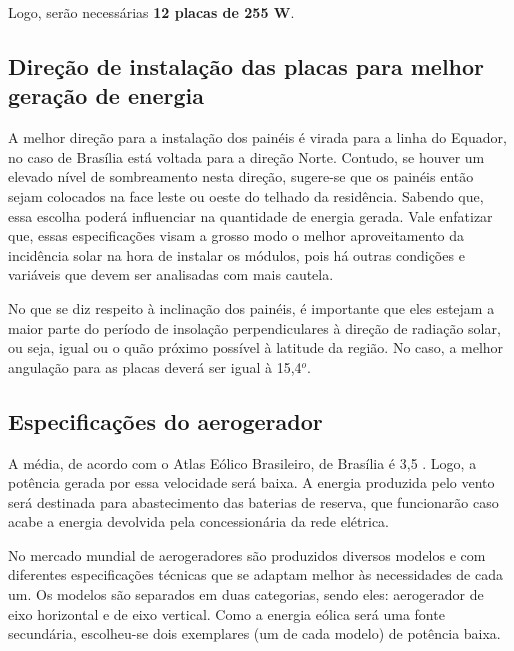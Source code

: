 	Logo, serão necessárias \textbf{12 placas de 255 \si{\watt}}.


\subsection{Direção de instalação das placas para melhor geração de energia}

	A melhor direção para a instalação dos painéis é virada para a linha do Equador, no caso de Brasília está voltada para a direção Norte. Contudo, se houver um elevado nível de sombreamento nesta direção, sugere-se que os painéis então sejam colocados na face leste ou oeste do telhado da residência. Sabendo que, essa escolha poderá influenciar na quantidade de energia gerada. Vale enfatizar que, essas especificações visam a grosso modo o melhor aproveitamento da incidência solar na hora de instalar os módulos, pois há outras condições e variáveis que devem ser analisadas com mais cautela. 

	No que se diz respeito à inclinação dos painéis, é importante que eles estejam a maior parte do período de insolação perpendiculares à direção de radiação solar, ou seja, igual ou o quão próximo possível à latitude da região. No caso, a melhor angulação para as placas deverá ser igual à 15,4$^o$.

\subsection{Especificações do aerogerador}

	A média, de acordo com o Atlas Eólico Brasileiro, de Brasília é 3,5 \nicefrac{\si{\meter}}{\si{\second}}. Logo, a potência gerada por essa velocidade será baixa. A energia produzida pelo vento será destinada para abastecimento das baterias de reserva, que funcionarão caso acabe a energia devolvida pela concessionária da rede elétrica.

	No mercado mundial de aerogeradores são produzidos diversos modelos e com diferentes especificações técnicas que se adaptam melhor às necessidades de cada um. Os modelos são separados em duas categorias, sendo eles: aerogerador de eixo horizontal e de eixo vertical. Como a energia eólica será uma fonte secundária, escolheu-se dois exemplares (um de cada modelo) de potência baixa.

